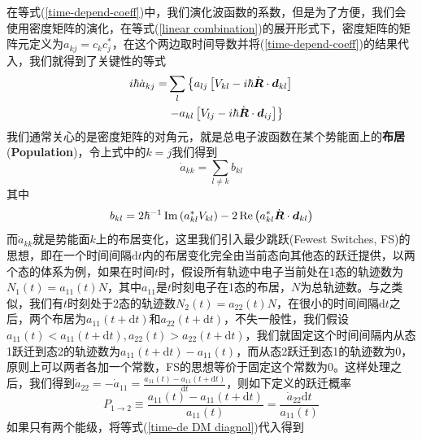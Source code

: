 \documentclass[12pt,a4paper,openany,twoside]{book}
\numberwithin{equation}{section}
\newcommand{\ud}{\mathrm{d}}
\begin{document}
        在等式(\ref{time-depend-coeff})中，我们演化波函数的系数，但是为了方便，我们会使用密度矩阵的演化，在等式(\ref{linear combination})的展开形式下，密度矩阵的矩阵元定义为$a_{kj}=c_k c_j^*$，在这个两边取时间导数并将(\ref{time-depend-coeff})的结果代入，我们就得到了关键性的等式
        \begin{equation}
          \begin{aligned}
            i \hbar \dot{a}_{k j}=& \sum_{l}\left\{a_{l j}\left[V_{k l}-i \hbar \dot{\vb*{R}} \cdot \vb*{d}_{k l}\right]\right.\\
            &\left. -a_{k l}\left[V_{l j}-i \hbar \dot{\vb*{R}} \cdot \vb*{d}_{i j}\right] \right\}
          \end{aligned}
          \label{time-de DM}
        \end{equation}
        我们通常关心的是密度矩阵的对角元，就是总电子波函数在某个势能面上的\textbf{布居}(\textbf{Population})，令上式中的$k=j$我们得到
        \begin{equation}
          \dot{a}_{k k}=\sum_{l \neq k} b_{k l}
        \end{equation}
        其中
        \begin{equation}
          b_{k l}=2 \hbar^{-1} \operatorname{Im}\left(a_{k l}^{*} V_{k l}\right)-2 \operatorname{Re}\left(a_{k l}^{*} \dot{\vb*{R}} \cdot \vb*{d}_{k l}\right)
          \label{time-de DM diagnol}
        \end{equation}
        而$\dot{a}_{k k}$就是势能面$k$上的布居变化，这里我们引入最少跳跃(Fewest Switches, FS)的思想，即在一个时间间隔$\ud t$内的布居变化完全由当前态向其他态的跃迁提供，以两个态的体系为例，如果在时间$t$时，假设所有轨迹中电子当前处在1态的轨迹数为$N_1(t)=a_{11}(t)N$，其中$a_{11}$是$t$时刻电子在1态的布居，$N$为总轨迹数。与之类似，我们有$t$时刻处于2态的轨迹数$N_2(t)=a_{22}(t)N$，在很小的时间间隔$\ud t$之后，两个布居为$a_{11}(t+\ud t)$和$a_{22}(t+\ud t)$，不失一般性，我们假设$a_{11}(t)<a_{11}(t+\ud t),a_{22}(t)>a_{22}(t+\ud t)$，我们就固定这个时间间隔内从态1跃迁到态2的轨迹数为$a_{11}(t+\ud t)-a_{11}(t)$，而从态2跃迁到态1的轨迹数为$0$，原则上可以两者各加一个常数，FS的思想等价于固定这个常数为$0$。这样处理之后，我们得到$\dot{a}_{22}=-\dot{a}_{11}=\frac{a_{11}(t)-a_{11}(t+\ud t)}{\ud t}$，则如下定义的跃迁概率
        \begin{equation}
          P_{1\rightarrow2}\equiv\frac{a_{11}(t)-a_{11}(t+\ud t)}{a_{11}(t)}=\frac{\dot{a}_{22} \ud t }{ a_{11}(t)}
        \end{equation}
        如果只有两个能级，将等式(\ref{time-de DM diagnol})代入得到
\end{document}
